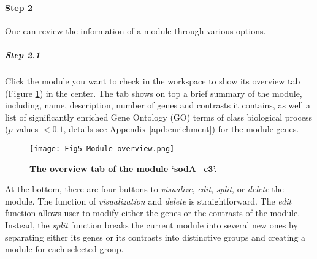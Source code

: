 \begin{small} %
\paragraph{Step 2} One can review the information of a module through various 
options.

\subparagraph{Step 2.1}	Click the module you want to check in the workspace 
to show its overview tab (Figure  \ref{fig:colombos-init-module}) in the center.
The tab shows on top a brief summary of the module, including, name,
description, number of genes and contrasts it contains, as well a list of
significantly enriched Gene Ontology (GO) terms of class biological process
($p$-values $< 0.1$, details see Appendix \ref{apd:enrichment}) for the module
genes.
%
\begin{figure}[tb]
	\centering
  	\texttt{[image: Fig5-Module-overview.png]}
	\caption[`sodA\_c3' module overview]{\textbf{The overview tab of 
	the module `sodA\_c3'.}}
	\label{fig:colombos-init-module}
\end{figure}
%
At the bottom, there are four buttons to \textit{visualize}, \textit{edit},
\textit{split}, or \textit{delete} the module. The function of
\textit{visualization} and \textit{delete} is straightforward. The
\textit{edit} function allows user to modify either the genes or the contrasts
of the module. Instead, the \textit{split} function breaks the current module
into several new ones by separating either its genes or its contrasts into
distinctive groups and creating a module for each selected group.



\end{small}
